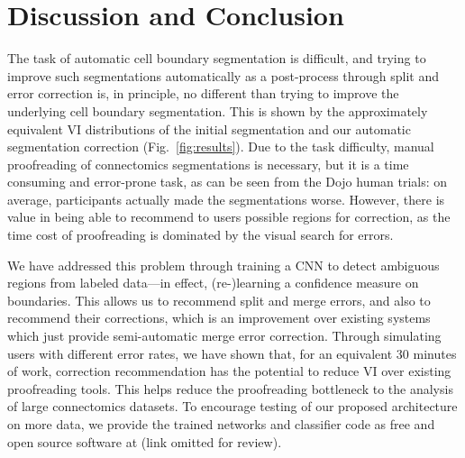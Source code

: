 \section{Discussion and Conclusion}

The task of automatic cell boundary segmentation is difficult, and trying to improve such segmentations automatically as a post-process through split and error correction is, in principle, no different than trying to improve the underlying cell boundary segmentation. This is shown by the approximately equivalent VI distributions of the initial segmentation and our automatic segmentation correction (Fig.~\ref{fig:results}). Due to the task difficulty, manual proofreading of connectomics segmentations is necessary, but it is a time consuming and error-prone task, as can be seen from the Dojo human trials: on average, participants actually made the segmentations worse. However, there is value in being able to recommend to users possible regions for correction, as the time cost of proofreading is dominated by the visual search for errors.

We have addressed this problem through training a CNN to detect ambiguous regions from labeled data---in effect, (re-)learning a confidence measure on boundaries. This allows us to recommend split and merge errors, and also to recommend their corrections, which is an improvement over existing systems which just provide semi-automatic merge error correction. Through simulating users with different error rates, we have shown that, for an equivalent 30 minutes of work, correction recommendation has the potential to reduce VI over existing proofreading tools. This helps reduce the proofreading bottleneck to the analysis of large connectomics datasets. To encourage testing of our proposed architecture on more data, we provide the trained networks and classifier code as free and open source software at (link omitted for review).




